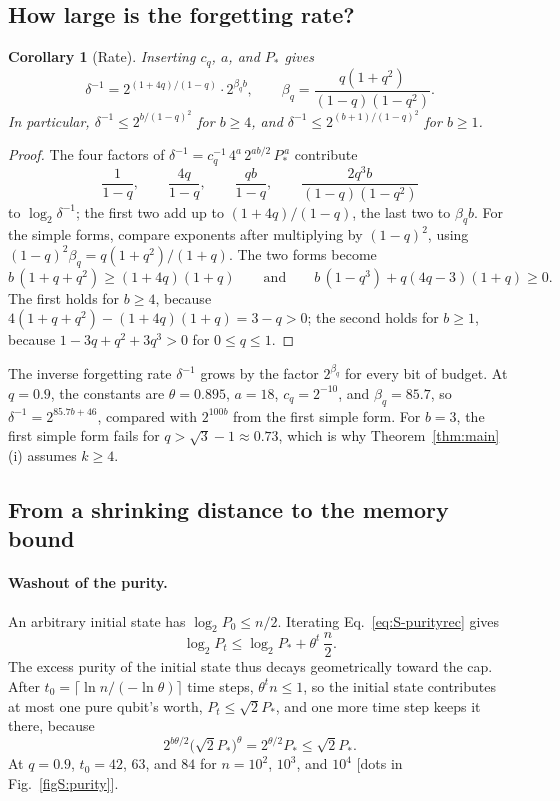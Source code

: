 \documentclass[aps,prl,twocolumn,superscriptaddress,floatfix]{revtex4-2}
\theoremstyle{plain}
\newtheorem{corollary}[lemma]{Corollary}
\begin{document}
\subsection{How large is the forgetting rate?}
\label{sm:rate}

\begin{corollary}[Rate]\label{cor:rate}
Inserting $c_q$, $a$, and $P_*$ gives
\begin{equation}
\delta^{-1}=2^{(1+4q)/(1-q)}\cdot2^{\beta_qb},\qquad\beta_q=\frac{q(1+q^2)}{(1-q)(1-q^2)} .
\label{eq:S-rate}
\end{equation}
In particular, $\delta^{-1}\le2^{b/(1-q)^2}$ for $b\ge4$, and $\delta^{-1}\le2^{(b+1)/(1-q)^2}$ for $b\ge1$.
\end{corollary}

\begin{proof}
The four factors of $\delta^{-1}=c_q^{-1}\,4^{a}\,2^{ab/2}\,P_*^{\,a}$ contribute
\[
\frac1{1-q},\qquad\frac{4q}{1-q},\qquad\frac{qb}{1-q},\qquad\frac{2q^3b}{(1-q)(1-q^2)}
\]
to $\log_2\delta^{-1}$; the first two add up to $(1+4q)/(1-q)$, the last two to $\beta_qb$. For the simple forms, compare exponents after multiplying by $(1-q)^2$, using $(1-q)^2\beta_q=q(1+q^2)/(1+q)$. The two forms become
\[
b\,(1+q+q^2)\ge(1+4q)(1+q)\qquad\text{and}\qquad b\,(1-q^3)+q(4q-3)(1+q)\ge0 .
\]
The first holds for $b\ge4$, because $4(1+q+q^2)-(1+4q)(1+q)=3-q>0$; the second holds for $b\ge1$, because $1-3q+q^2+3q^3>0$ for $0\le q\le1$.
\end{proof}

The inverse forgetting rate $\delta^{-1}$ grows by the factor $2^{\beta_q}$ for every bit of budget. At $q=0.9$, the constants are $\theta=0.895$, $a=18$, $c_q=2^{-10}$, and $\beta_q=85.7$, so $\delta^{-1}=2^{85.7b+46}$, compared with $2^{100b}$ from the first simple form. For $b=3$, the first simple form fails for $q>\sqrt3-1\approx0.73$, which is why Theorem~\ref{thm:main}(i) assumes $k\ge4$.

\subsection{From a shrinking distance to the memory bound}
\label{sm:memory}

\paragraph*{Washout of the purity.} An arbitrary initial state has $\log_2P_0\le n/2$. Iterating Eq.~\eqref{eq:S-purityrec} gives
\begin{equation}
\log_2P_t\le\log_2P_*+\theta^t\,\frac n2 .
\label{eq:S-washout}
\end{equation}
The excess purity of the initial state thus decays geometrically toward the cap. After $t_0=\lceil\ln n/(-\ln\theta)\rceil$ time steps, $\theta^tn\le1$, so the initial state contributes at most one pure qubit's worth, $P_t\le\sqrt2P_*$, and one more time step keeps it there, because
\[
2^{b\theta/2}\bigl(\sqrt2P_*\bigr)^\theta=2^{\theta/2}P_*\le\sqrt2P_* .
\] At $q=0.9$, $t_0=42$, $63$, and $84$ for $n=10^2$, $10^3$, and $10^4$ [dots in Fig.~\ref{figS:purity}].
\end{document}
